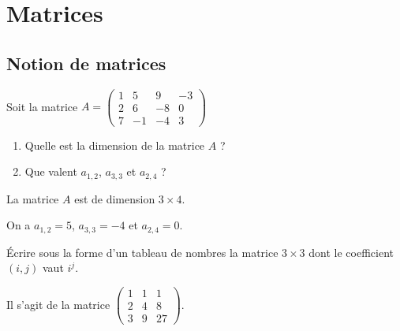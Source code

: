 \documentclass[11pt,fleqn]{book} %
\begin{document}
\chapter*{Matrices}
 
\section*{Notion de matrices}

\begin{exercise}[topic=mat01]
\vskip2pt
\begin{minipage}{0.45\linewidth}
Soit la matrice \(A = \begin{pmatrix}
1 & 5 & 9 & -3 \\ 2 & 6 & -8 & 0 \\ 7 & -1 & -4 & 3
\end{pmatrix}\)
\end{minipage} \hfill\begin{minipage}{0.5\linewidth}
\begin{enumerate}
\item Quelle est la dimension de la matrice $A$ ?
\item Que valent $a_{1,2}$, $a_{3,3}$ et $a_{2,4}$ ?
\end{enumerate}
\end{minipage}
\end{exercise}

\begin{solution}La matrice \(A\) est de dimension \(3\times 4\).

On a \(a_{1,2} = 5\), \(a_{3,3} = -4\) et \(a_{2,4} = 0\).\end{solution}

\begin{exercise}[topic=mat01]Écrire sous la forme d'un tableau de nombres la matrice $3 \times 3$ dont le coefficient $(i,j)$ vaut $i^j$.\end{exercise}

\begin{solution}Il s'agit de la matrice \(\begin{pmatrix}1 & 1 & 1 \\ 2 & 4 & 8 \\ 3 & 9 & 27 \end{pmatrix}\).\end{solution}
\end{document}
